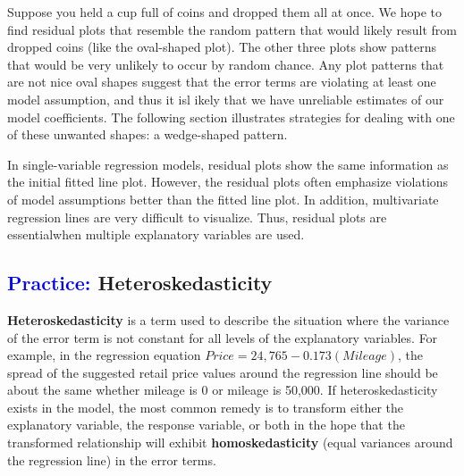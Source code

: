 \documentclass[
]{report}
\begin{document}
Suppose you held a cup full of coins and dropped them all at once. We hope to find residual plots that resemble the random pattern that would likely result from dropped coins (like the oval-shaped plot). The other three plots show patterns that would be very unlikely to occur by random chance. Any plot patterns that are not nice oval shapes suggest that the error terms are violating at least one model assumption, and thus it isl ikely that we have unreliable estimates of our model coefficients. The following section illustrates strategies for dealing with one of these unwanted shapes: a wedge-shaped pattern.

In single-variable regression models, residual plots show the same information as the initial fitted line plot. However, the residual plots often emphasize violations of model assumptions better than the fitted line plot. In addition, multivariate regression lines are very difficult to visualize. Thus, residual plots are essentialwhen multiple explanatory variables are used.

\hypertarget{heteroskedasticity}{%
\subsection*{\texorpdfstring{\textcolor{blue}{Practice:} Heteroskedasticity}{ Heteroskedasticity}}\label{heteroskedasticity}}

\textbf{Heteroskedasticity} is a term used to describe the situation where the variance of the error term is not constant for all levels of the explanatory variables. For example, in the regression equation \(\scriptstyle Price = 24,765 - 0.173 (Mileage)\), the spread of the suggested retail price values around the regression line should be about the same whether mileage is 0 or mileage is 50,000. If heteroskedasticity exists in the model, the most common remedy is to transform either the explanatory variable, the response variable, or both in the hope that the transformed relationship will exhibit \textbf{homoskedasticity} (equal variances around the regression line) in the error terms.
\end{document}
